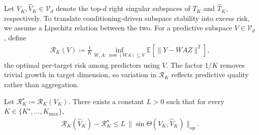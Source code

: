 Let $V_K, \widehat{V}_K \in\mathcal{V}_d$ denote the top-$d$ right singular subspaces of $T_K$ and $\widehat T_K$, respectively.
To translate conditioning-driven subspace stability into excess risk, we assume a Lipschitz relation between the two. 
For a predictive subspace $V\in \mathcal{V}_d$, define
\begin{align}
\label{eq:per_target_risk}
    \mathcal R_K(V)
    \coloneqq
    \frac{1}{K}
    \inf_{W,A:\,\operatorname{row}(WA)\subseteq V}
    \mathbb{E}\!\left[\|Y-WAZ\|^2\right],
\end{align}
the optimal per-target risk among predictors using $V$. 
The factor $1/K$ removes trivial growth in target dimension, so variation
in $\mathcal R_K$ reflects predictive quality rather than aggregation.
\begin{assumption}
\label{ass:lipschitz_excess_risk}
Let $\mathcal R_K^\star \coloneqq \mathcal R_K(V_K)$. There exists a constant
$L>0$ such that for every $K\in\{K^\star,\ldots,K_{\max}\}$,
\begin{align}
    \mathcal R_K(\widehat V_K) - \mathcal R_K^\star
    \le
    L \, \|\sin\Theta(V_K, \widehat V_K)\|_{\mathrm{op}}.
\end{align}
\end{assumption}



